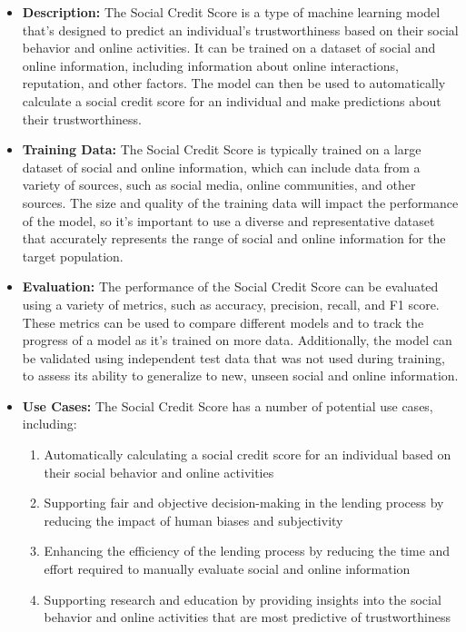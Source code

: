 \begin{itemize}
    \item \textbf{Description:} The Social Credit Score is a type of machine learning model that's designed to predict an individual's trustworthiness based on their social behavior and online activities. It can be trained on a dataset of social and online information, including information about online interactions, reputation, and other factors. The model can then be used to automatically calculate a social credit score for an individual and make predictions about their trustworthiness.
    \item \textbf{Training Data:} The Social Credit Score is typically trained on a large dataset of social and online information, which can include data from a variety of sources, such as social media, online communities, and other sources. The size and quality of the training data will impact the performance of the model, so it's important to use a diverse and representative dataset that accurately represents the range of social and online information for the target population.
    \item \textbf{Evaluation:} The performance of the Social Credit Score can be evaluated using a variety of metrics, such as accuracy, precision, recall, and F1 score. These metrics can be used to compare different models and to track the progress of a model as it's trained on more data. Additionally, the model can be validated using independent test data that was not used during training, to assess its ability to generalize to new, unseen social and online information.
    \item \textbf{Use Cases:} The Social Credit Score has a number of potential use cases, including:
        \begin{enumerate}  
            \item Automatically calculating a social credit score for an individual based on their social behavior and online activities
            \item Supporting fair and objective decision-making in the lending process by reducing the impact of human biases and subjectivity
            \item Enhancing the efficiency of the lending process by reducing the time and effort required to manually evaluate social and online information
            \item Supporting research and education by providing insights into the social behavior and online activities that are most predictive of trustworthiness

\end{enumerate}
\end{itemize}
